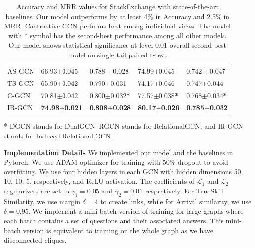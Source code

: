 \begin{table}[!h]
\begin{threeparttable}[!h]
\begin{subtable}{\textwidth}
{\begin{tabular}{l|l l| l l }
    \cmidrule(lr){1-1}\cmidrule(lr){2-5}%
    {AS-GCN} & 66.93$\pm$0.045 & 0.788 $\pm$0.028 & 74.99$\pm$0.045 &0.742 $\pm$0.047\\
    {TS-GCN} & 65.90$\pm$0.042 & 0.790$\pm$0.031 & 74.17$\pm$0.046 &0.747$\pm$0.044\\
    {C-GCN} & 70.81$\pm$0.042 & 0.800$\pm$0.032\textbf{*}& 77.57$\pm$0.038\textbf{*} & 0.768$\pm$0.034\textbf{*}\\
    {IR-GCN} & \bfseries74.98$\pm$\bfseries0.021 & \bfseries0.808$\pm$\bfseries0.028 & \bfseries80.17$\pm$\bfseries0.026 & \bfseries0.785$\pm$\bfseries0.032\\
    \bottomrule
  \end{tabular}
  }
  \end{subtable}
   \begin{tablenotes}
       \footnotesize
       \item[*] DGCN stands for DualGCN, RGCN stands for RelationalGCN, and IR-GCN stands for Induced Relational GCN.
   \end{tablenotes}
   \caption{\label{tab:stackacc} Accuracy and MRR values for StackExchange with state-of-the-art baselines. Our model outperforms by at least 4\% in Accuracy and 2.5\% in MRR. Contrastive GCN performs best among individual views. The model with $*$ symbol has the second-best performance among all other models. Our model shows statistical significance at level 0.01 overall second best model on single tail paired t-test.}
   \end{threeparttable}
 \end{table}


\noindent
\textbf{Implementation Details}
We implemented our model and the baselines in Pytorch. We use ADAM optimizer \cite{ADAM} for training with 50\% dropout to avoid overfitting. We use four hidden layers in each GCN with hidden dimensions 50, 10, 10, 5, respectively, and ReLU activation. The coefficients of $\mathcal{L}_1$ and $\mathcal{L}_2$ regularizers are set to $\gamma_1 = 0.05$ and $\gamma_2 = 0.01$ respectively. For TrueSkill Similarity, we use margin $\delta = 4$ to create links, while for Arrival similarity, we use $\delta = 0.95$.
We implement a mini-batch version of training for large graphs where each batch contains a set of questions and their associated answers.  This mini-batch version is equivalent to training on the whole graph as we have disconnected cliques.


